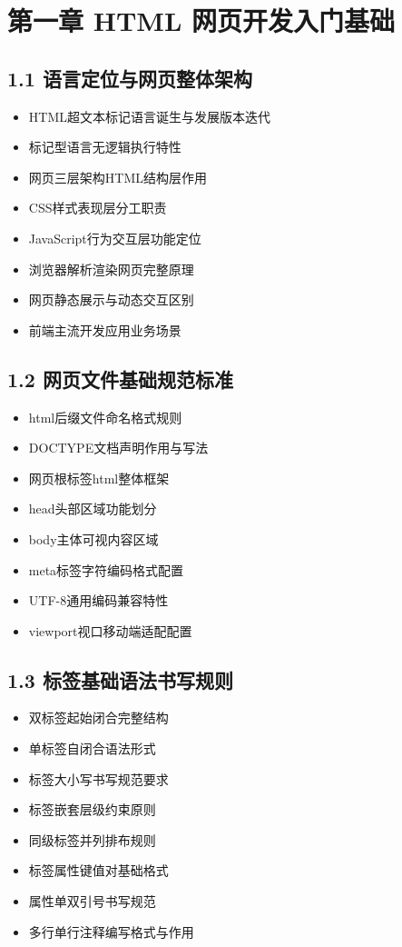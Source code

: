 
\section{第一章 HTML 网页开发入门基础}
\subsection{1.1 语言定位与网页整体架构}
\begin{itemize}[leftmargin=*]
\item HTML超文本标记语言诞生与发展版本迭代
\item 标记型语言无逻辑执行特性
\item 网页三层架构HTML结构层作用
\item CSS样式表现层分工职责
\item JavaScript行为交互层功能定位
\item 浏览器解析渲染网页完整原理
\item 网页静态展示与动态交互区别
\item 前端主流开发应用业务场景
\end{itemize}

\subsection{1.2 网页文件基础规范标准}
\begin{itemize}[leftmargin=*]
\item html后缀文件命名格式规则
\item DOCTYPE文档声明作用与写法
\item 网页根标签html整体框架
\item head头部区域功能划分
\item body主体可视内容区域
\item meta标签字符编码格式配置
\item UTF-8通用编码兼容特性
\item viewport视口移动端适配配置
\end{itemize}

\subsection{1.3 标签基础语法书写规则}
\begin{itemize}[leftmargin=*]
\item 双标签起始闭合完整结构
\item 单标签自闭合语法形式
\item 标签大小写书写规范要求
\item 标签嵌套层级约束原则
\item 同级标签并列排布规则
\item 标签属性键值对基础格式
\item 属性单双引号书写规范
\item 多行单行注释编写格式与作用
\end{itemize}

